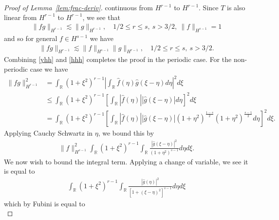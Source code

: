 \documentclass[12pt,reqno]{amsart}
\numberwithin{equation}{section}  %
\numberwithin{figure}{section}
\newcommand{\rr}{\mathbb{R}}
\newcommand{\wh}{\widehat}
\begin{document}
\begin{proof}[Proof of Lemma~\ref{lem:frac-deriv}]
continuous from $H^{r-1}$ to $H^{r-1}$. Since $T$ is also linear from $H^{r-1}$
to $H^{r-1}$, we see that 
%
%
\begin{equation*}
\begin{split}
  \| f g \|_{H^{r-1}} \lesssim \| g \|_{H^{r-1}}, \quad 1/2 \le r \le s, \ s > 3/2, \ \| f \|_{H^{s-1}} =1
\end{split}
\end{equation*}
and so for general $f \in H^{s-1}$ we have 
%
\begin{equation}
  \label{hhh}
\begin{split}
  \| f g \|_{H^{r-1}} \lesssim \|f \|_{H^{s-1}}
  \| g \|_{H^{r-1}}, \quad 1/2 \le r \le s, \ s > 3/2. 
\end{split}
\end{equation}
%
Combining \eqref{yhh} and \eqref{hhh} completes the proof in the periodic
case. For the non-periodic case we have
%
%
\begin{equation*}
\begin{split}
  \| fg\|_{H^{r-1}}^{2}
  & = \int_{\rr} (1 + \xi^{2})^{r-1}| \int_{\rr}
  \wh{f}(\eta) \wh{g}( \xi - \eta) d \eta |^{2} d \xi
  \\
  & \le \int_{\rr} (1 + \xi^{2})^{r-1}\left [ \int_{\rr}
  | \wh{f}(\eta) |  | \wh{g}(\xi - \eta) | 
  d \eta \right ]^{2} d \xi
  \\
  & = \int_{\rr}  (1 + \xi^{2})^{r-1}\left [ \int_{\rr}
  | \wh{f}(\eta) |  | \wh{g}(\xi - \eta) | (1 +
  \eta^{2})^{\frac{1-s}{2}} (1 + \eta^{2})^{\frac{s-1}{2}}
  d \eta \right ]^{2} d \xi.
  \end{split}
\end{equation*}
%
Applying Cauchy Schwartz in $\eta$, we bound this by
%
%
%
\begin{equation*}
\begin{split}
  \| f \|_{H^{s-1}}^{2} \int_{\rr}  (1 + \xi^{2})^{r-1}\int_{\rr} \frac{|
  \wh{g}(\xi - \eta) |^{2}}{(1 + \eta^{2})^{s-1}} d \eta d \xi.
  \end{split}
\end{equation*}
%
We now wish to bound the integral term. Applying a change of variable, we see it
is equal to
%
\begin{equation*}
\begin{split}
  \int_{\rr} (1 + \xi^{2})^{r-1} \int_{\rr}
\frac{| \wh{g}(\eta) |^{2}}{[1 + (\xi - \eta)^{2}]^{s-1}} d \eta d \xi
  \end{split}
\end{equation*}
which by Fubini is equal to
%
%
\begin{equation}

\end{equation}
\end{proof}
\end{document}
